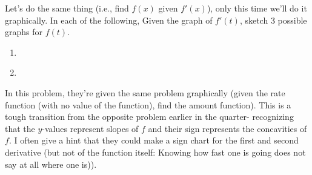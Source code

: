 \documentclass{ximera}
\begin{document}
\begin{exercise} 
Let's do the same thing (i.e., find $f(x)$  given  $f'(x)$), only this time we'll do it graphically.  In each of the following, Given the graph of  $f'(t)$, sketch $3$ possible graphs for  $f(t)$.

\begin{enumerate}
    \item \leavevmode\vadjust{\vspace{-\baselineskip}}\newline
    \begin{center}
    \end{center}
    \item \leavevmode\vadjust{\vspace{-\baselineskip}}\newline
    \begin{center}
    \end{center}
\end{enumerate}

\begin{instructorNotes}
In this problem, they're given the same problem graphically (given the rate function (with no value of the function), find the amount function).  This is a tough transition from the opposite problem earlier in the quarter- recognizing that the $y$-values represent slopes of $f$ and their sign represents the concavities of $f$.  I often give a hint that they could make a sign chart for the first and second derivative (but not of the function itself:  Knowing how fast one is going does not say at all where one is)).
\end{instructorNotes}

\end{exercise}
\end{document}
